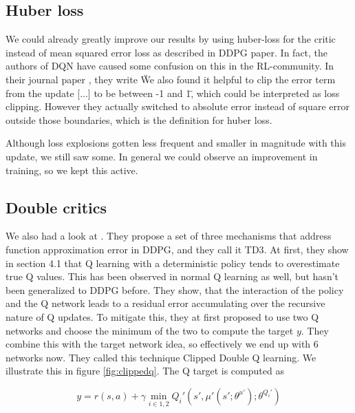 \documentclass[hyperref,beleg]{cgvpub}
\begin{document}
\subsection{Huber loss}
We could already greatly improve our results by using huber-loss \cite{huber1964} for the critic instead of mean squared error loss as described in DDPG paper. In fact, the authors of \ac{DQN} have caused some confusion on this in the \ac{RL}-community. In their journal paper \cite{mnihHumanlevelControlDeep2015}, they write \"We also found it helpful to clip the error term from the update [...] to be between -1 and 1\", which could be interpreted as loss clipping. However they actually switched to absolute error instead of square error outside those boundaries, which is the definition for huber loss.

Although loss explosions gotten less frequent and smaller in magnitude with this update, we still saw some. In general we could observe an improvement in training, so we kept this active.

\subsection{Double critics}
\label{sec:double_critics}

We also had a look at \cite{fujimotoAddressingFunctionApproximation2018}. They propose a set of three mechanisms that address function approximation error in \ac{DDPG}, and they call it \ac{TD3}. At first, they show in section 4.1 that Q learning with a deterministic policy tends to overestimate true Q values. This has been observed in normal Q learning as well, but hasn't been generalized to \ac{DDPG} before. They show, that the interaction of the policy and the Q network leads to a residual error accumulating over the recursive nature of Q updates. To mitigate this, they at first proposed to use two Q networks and choose the minimum of the two to compute the target $y$. They combine this with the target network idea, so effectively we end up with 6 networks now. They called this technique Clipped Double Q learning. We illustrate this in figure \ref{fig:clippedq}. The Q target is computed as 

\begin{equation}
y = r(s, a) + \gamma \min_{i \in {1,2}} Q_i'(s', \mu'(s';\theta^{\mu'});\theta^{Q_i'})
\end{equation}
\end{document}

